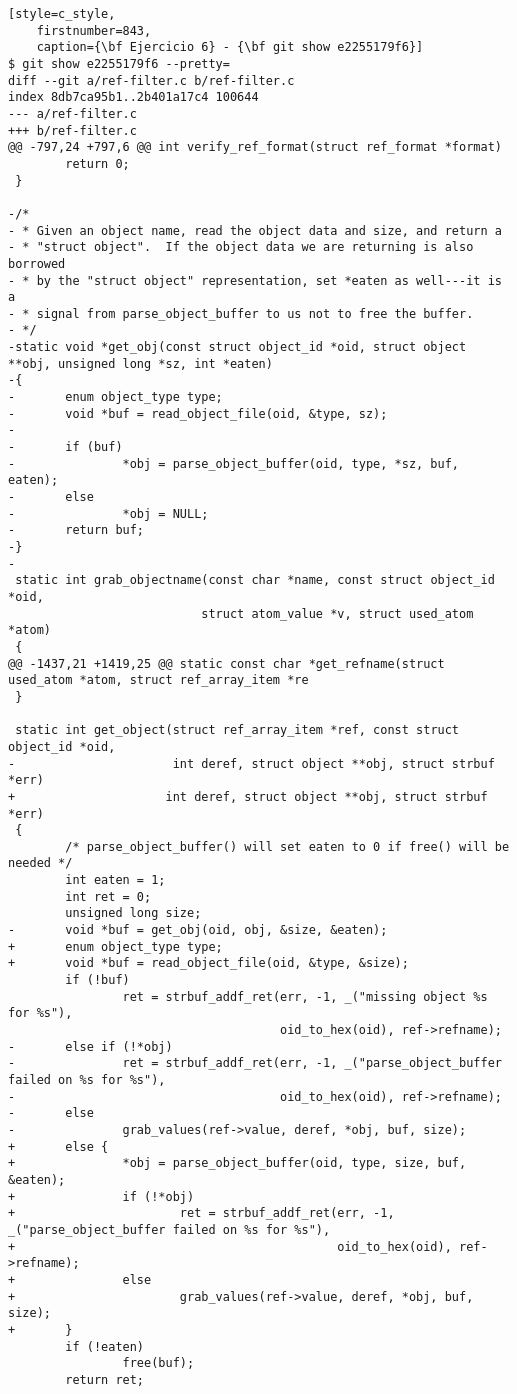 \begin{lstlisting}[style=c_style,
	firstnumber=843,
	caption={\bf Ejercicio 6} - {\bf git show e2255179f6}]
$ git show e2255179f6 --pretty=
diff --git a/ref-filter.c b/ref-filter.c
index 8db7ca95b1..2b401a17c4 100644
--- a/ref-filter.c
+++ b/ref-filter.c
@@ -797,24 +797,6 @@ int verify_ref_format(struct ref_format *format)
        return 0;
 }
 
-/*
- * Given an object name, read the object data and size, and return a
- * "struct object".  If the object data we are returning is also borrowed
- * by the "struct object" representation, set *eaten as well---it is a
- * signal from parse_object_buffer to us not to free the buffer.
- */
-static void *get_obj(const struct object_id *oid, struct object **obj, unsigned long *sz, int *eaten)
-{
-       enum object_type type;
-       void *buf = read_object_file(oid, &type, sz);
-
-       if (buf)
-               *obj = parse_object_buffer(oid, type, *sz, buf, eaten);
-       else
-               *obj = NULL;
-       return buf;
-}
-
 static int grab_objectname(const char *name, const struct object_id *oid,
                           struct atom_value *v, struct used_atom *atom)
 {
@@ -1437,21 +1419,25 @@ static const char *get_refname(struct used_atom *atom, struct ref_array_item *re
 }
 
 static int get_object(struct ref_array_item *ref, const struct object_id *oid,
-                      int deref, struct object **obj, struct strbuf *err)
+                     int deref, struct object **obj, struct strbuf *err)
 {
        /* parse_object_buffer() will set eaten to 0 if free() will be needed */
        int eaten = 1;
        int ret = 0;
        unsigned long size;
-       void *buf = get_obj(oid, obj, &size, &eaten);
+       enum object_type type;
+       void *buf = read_object_file(oid, &type, &size);
        if (!buf)
                ret = strbuf_addf_ret(err, -1, _("missing object %s for %s"),
                                      oid_to_hex(oid), ref->refname);
-       else if (!*obj)
-               ret = strbuf_addf_ret(err, -1, _("parse_object_buffer failed on %s for %s"),
-                                     oid_to_hex(oid), ref->refname);
-       else
-               grab_values(ref->value, deref, *obj, buf, size);
+       else {
+               *obj = parse_object_buffer(oid, type, size, buf, &eaten);
+               if (!*obj)
+                       ret = strbuf_addf_ret(err, -1, _("parse_object_buffer failed on %s for %s"),
+                                             oid_to_hex(oid), ref->refname);
+               else
+                       grab_values(ref->value, deref, *obj, buf, size);
+       }
        if (!eaten)
                free(buf);
        return ret;
\end{lstlisting}

